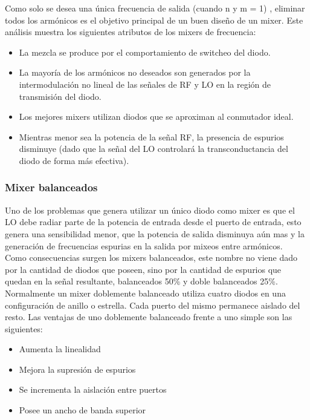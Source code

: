 \documentclass[a4paper,10pt]{article}
\begin{document}
	\indent Como solo se desea una única frecuencia de salida (cuando n y m = 1)
	, eliminar todos los armónicos es el objetivo principal de un buen diseño 
	de un mixer. Este análisis muestra los siguientes atributos de los mixers de
	frecuencia:

	\begin{itemize}
		\item La mezcla se produce por el comportamiento de switcheo del diodo.
		\item La mayoría de los armónicos no deseados son generados por la 
		intermodulación no lineal de las señales de RF y LO en la región de 
		transmisión del diodo.
		\item Los mejores mixers utilizan diodos que se aproximan al conmutador 
		ideal.
		\item Mientras menor sea la potencia de la señal RF, la presencia de 
		espurios disminuye (dado que la señal del LO controlará la 
		transconductancia del diodo de forma más efectiva).
	\end{itemize}

	\subsubsection{Mixer balanceados}
	\indent Uno de los problemas que genera utilizar un único diodo como mixer 
	es que el LO debe radiar parte de la potencia de entrada desde el puerto de 
	entrada, esto genera una sensibilidad menor, que la potencia de salida 
	disminuya aún mas y la generación de frecuencias espurias en la salida por 
	mixeos entre armónicos. \\
	\indent Como consecuencias surgen los mixers balanceados, este nombre no 
	viene dado por la cantidad de diodos que poseen, sino por la cantidad de 
	espurios que quedan en la señal resultante, balanceados 50\% y doble 
	balanceados 25\%. \\
	\indent Normalmente un mixer doblemente balanceado utiliza cuatro diodos en 
	una configuración de anillo o estrella. Cada puerto del mismo permanece
	aislado del resto. Las ventajas de uno doblemente balanceado frente a uno 
	simple son las siguientes:
	
	\begin{itemize}
		\item Aumenta la linealidad
		\item Mejora la supresión de espurios
		\item Se incrementa la aislación entre puertos
		\item Posee un ancho de banda superior
	\end{itemize}
\end{document}
